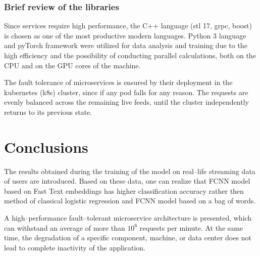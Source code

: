 \documentclass[12pt]{jpconf}
\begin{document}
\subsubsection*{Brief review of the libraries}
Since services require high performance, the C++ language (stl 17, grpc, boost) is chosen as one of the most productive modern languages. Python 3 language and pyTorch framework were utilized for data analysis and training due to the high efficiency and the possibility of conducting parallel calculations, both on the CPU and on the GPU cores of the machine.

The fault tolerance of microservices is ensured by their deployment in the kubernetes (k8s) cluster, since if any pod falls for any reason. The requests are evenly balanced across the remaining live feeds, until the cluster independently returns to its previous state. 

\section{Conclusions}

The results obtained during the training of the model on real--life streaming data of users are introduced. Based on these data, one can realize that FCNN model based on Fast Text embeddings has higher classification accuracy rather then method of classical logistic regression and FCNN  model based on a bag of words.

A high--performance fault--tolerant microservice architecture is presented, which can withstand an average of more than $10^6$  requests per minute. At the same time, the degradation of a specific component, machine, or data center does not lead to complete inactivity of the application.
\end{document}
